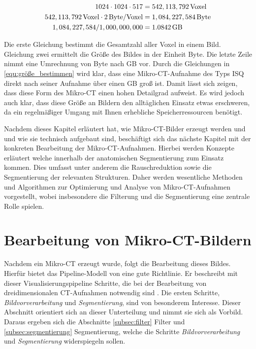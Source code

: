 \begin{align}
	\label{equ:größe_bestimmen}1024 \cdot 1024 \cdot 517    & = 542,113,792 \, \text{Voxel}\notag  \\
	542,113,792 \, \text{Voxel}\cdot 2 \, \text{Byte/Voxel} & = 1,084,227,584 \, \text{Byte}\notag \\
	1,084,227,584 / 1,000,000,000                           & = 1.0842 \, \text{GB}
\end{align}

Die erste Gleichung bestimmt die Gesamtzahl aller Voxel in einem Bild. Gleichung
zwei ermittelt die Größe des Bildes in der Einheit Byte. Die letzte Zeile nimmt eine
Umrechnung von Byte nach \ac{GB} vor. Durch die Gleichungen in \ref{equ:größe_bestimmen}
wird klar, dass eine Mikro-\ac{CT}-Aufnahme des Typs \ac{ISQ} direkt nach seiner
Aufnahme über einen \ac{GB} groß ist. Damit lässt sich zeigen, dass diese Form des
Mikro-\ac{CT} einen hohen Detailgrad aufweist. Es wird jedoch auch klar, dass
diese Größe an Bildern den alltäglichen Einsatz etwas erschweren, da ein regelmäßiger
Umgang mit Ihnen erhebliche Speicherressourcen benötigt.

Nachdem dieses Kapitel erläutert hat, wie Mikro-\ac{CT}-Bilder erzeugt werden und
und wie sie technisch aufgebaut sind, beschäftigt sich das nächste Kapitel mit
der konkreten Bearbeitung der Mikro-\ac{CT}-Aufnahmen. Hierbei werden Konzepte
erläutert welche innerhalb der anatomischen Segmentierung zum Einsatz kommen. Dies
umfasst unter anderem die Rauschreduktion sowie die Segmentierung der relevanten
Strukturen. Daher werden wesentliche Methoden und Algorithmen zur Optimierung
und Analyse von Mikro-\ac{CT}-Aufnahmen vorgestellt, wobei insbesondere die
Filterung und die Segmentierung eine zentrale Rolle spielen.

\pagebreak

\section{Bearbeitung von Mikro-CT-Bildern}
\label{sec:bildbearbeitung} Nachdem ein Mikro-\ac{CT} erzeugt wurde, folgt die Bearbeitung
dieses Bildes. Hierfür bietet das Pipeline-Modell von \citet[S.~50]{handels2000}
eine gute Richtlinie. Er beschreibt mit dieser Visualisierungspipeline Schritte,
die bei der Bearbeitung von dreidimensionalen \ac{CT}-Aufnahmen notwendig sind
\citep[vgl.][S.~50]{handels2000}. Die ersten Schritte, \textit{Bildvorverarbeitung}
und \textit{Segmentierung}, sind von besonderem Interesse. Dieser Abschnitt orientiert
sich an dieser Unterteilung und nimmt sie sich als Vorbild. Daraus ergeben sich
die Abschnitte \ref{subsec:filter} Filter und \ref{subsec:segmentierung}
Segmentierung, welche die Schritte \textit{Bildvorverarbeitung} und \textit{Segmentierung}
widerspiegeln sollen.

